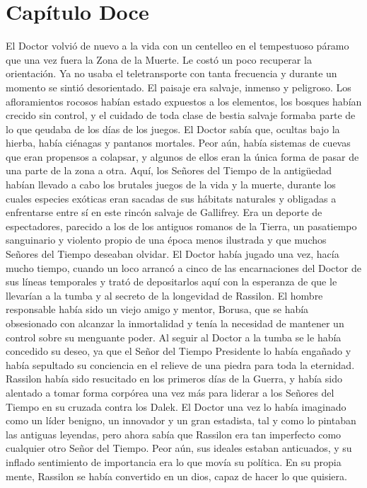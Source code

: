 \chapter*{Capítulo Doce}

El Doctor volvió de nuevo a la vida con un centelleo en el tempestuoso páramo que una vez fuera la Zona de la Muerte. 
Le costó un poco recuperar la orientación. Ya no usaba el teletransporte con tanta frecuencia y durante un momento se sintió desorientado. 
El paisaje era salvaje, inmenso y peligroso. Los afloramientos rocosos habían estado expuestos a los elementos, los bosques habían crecido sin control, y el cuidado de toda clase de bestia salvaje formaba parte de lo que qeudaba de los días de los juegos. El Doctor sabía que, ocultas bajo la hierba, había ciénagas y pantanos mortales. Peor aún, había sistemas de cuevas que eran propensos a colapsar, y algunos de ellos eran la única forma de pasar de una parte de la zona a otra. 
Aquí, los Señores del Tiempo de la antigüedad habían llevado a cabo los brutales juegos de la vida y la muerte, durante los cuales especies exóticas eran sacadas de sus hábitats naturales y obligadas a enfrentarse entre sí en este rincón salvaje de Gallifrey. Era un deporte de espectadores, parecido a los de los antiguos romanos de la Tierra, un pasatiempo sanguinario y violento propio de una época menos ilustrada y que muchos Señores del Tiempo deseaban olvidar. 
El Doctor había jugado una vez, hacía mucho tiempo, cuando un loco arrancó a cinco de las encarnaciones del Doctor de sus líneas temporales y trató de depositarlos aquí con la esperanza de que le llevarían a la tumba y al secreto de la longevidad de Rassilon. El hombre responsable había sido un viejo amigo y mentor, Borusa, que se había obsesionado con alcanzar la inmortalidad y tenía la necesidad de mantener un control sobre su menguante poder. 
Al seguir al Doctor a la tumba se le había concedido su deseo, ya que el Señor del Tiempo Presidente lo había engañado y había sepultado su conciencia en el relieve de una piedra para toda la eternidad. 
Rassilon había sido resucitado en los primeros días de la Guerra, y había sido alentado a tomar forma corpórea una vez más para liderar a los Señores del Tiempo en su cruzada contra los Dalek.
El Doctor una vez lo había imaginado como un líder benigno, un innovador y un gran estadista, tal y como lo pintaban las antiguas leyendas, pero ahora sabía que Rassilon era tan imperfecto como cualquier otro Señor del Tiempo. Peor aún, sus ideales estaban anticuados, y su inflado sentimiento de importancia era lo que movía su política. En su propia mente, Rassilon se había convertido en un dios, capaz de hacer lo que quisiera. 

